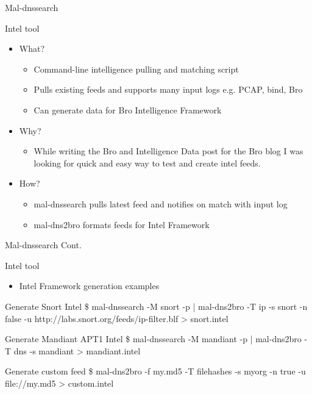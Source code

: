 \documentclass[xcolor=svgnames,handout]{beamer}
\begin{document}
\begin{frame}{Mal-dnssearch}
  \begin{block}{Intel tool}
    \begin{itemize}
      \item What?
    	\begin{itemize}
		\item Command-line intelligence pulling and matching script
		\item Pulls existing feeds and supports many input logs e.g. PCAP, bind, Bro
		\item Can generate data for Bro Intelligence Framework
	\end{itemize}
	\item Why?
    	\begin{itemize}
		\item While writing the Bro and Intelligence Data post for the
                  Bro blog I was looking for quick and easy way to test and
                  create intel feeds.
	\end{itemize}
	\item How?
    	\begin{itemize}
		\item mal-dnssearch pulls latest feed and notifies on match with
                  input log
		\item mal-dns2bro formats feeds for Intel Framework
	\end{itemize}
    \end{itemize}
    \end{block}
\end{frame}

\begin{frame}{Mal-dnssearch Cont.}
  \begin{block}{Intel tool}
  \begin{itemize}
    \item Intel Framework generation examples
  \end{itemize}
    \begin{exampleblock}{Generate Snort Intel}
      \alert{\$ mal-dnssearch -M snort -p | mal-dns2bro -T ip -s snort -n false -u
         http://labs.snort.org/feeds/ip-filter.blf > snort.intel}
    \end{exampleblock}
    \begin{exampleblock}{Generate Mandiant APT1 Intel}
	\alert{\$ mal-dnssearch -M mandiant -p | mal-dns2bro -T dns -s mandiant > mandiant.intel}
    \end{exampleblock}
    \begin{exampleblock}{Generate custom feed}
      \alert{\$ mal-dns2bro -f my.md5 -T filehashes -s myorg -n true -u file://my.md5 > custom.intel}
    \end{exampleblock}
    \end{block}
\end{frame}
\end{document}
